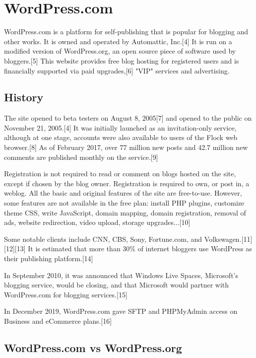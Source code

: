 \documentclass[12pt]{article}
\begin{document}
\tableofcontents


\newpage

\section{WordPress.com}

WordPress.com is a platform for self-publishing that is popular for blogging and other works. It is owned and operated by Automattic, Inc.[4] It is run on a modified version of WordPress.org, an open source piece of software used by bloggers.[5] This website provides free blog hosting for registered users and is financially supported via paid upgrades,[6] "VIP" services and advertising. 



\subsection{History}

The site opened to beta testers on August 8, 2005[7] and opened to the public on November 21, 2005.[4] It was initially launched as an invitation-only service, although at one stage, accounts were also available to users of the Flock web browser.[8] As of February 2017, over 77 million new posts and 42.7 million new comments are published monthly on the service.[9]

Registration is not required to read or comment on blogs hosted on the site, except if chosen by the blog owner. Registration is required to own, or post in, a weblog. All the basic and original features of the site are free-to-use. However, some features are not available in the free plan: install PHP plugins, customize theme CSS, write JavaScript, domain mapping, domain registration, removal of ads, website redirection, video upload, storage upgrades...[10]

Some notable clients include CNN, CBS, Sony, Fortune.com, and Volkswagen.[11][12][13] It is estimated that more than 30\% of internet bloggers use WordPress as their publishing platform.[14]

In September 2010, it was announced that Windows Live Spaces, Microsoft's blogging service, would be closing, and that Microsoft would partner with WordPress.com for blogging services.[15]

In December 2019, WordPress.com gave SFTP and PHPMyAdmin access on Business and eCommerce plans.[16] 


\subsection{WordPress.com vs WordPress.org}
\end{document}
